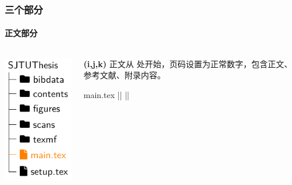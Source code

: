 \begin{frame}[fragile]
  \frametitle{三个部分}
  \framesubtitle{正文部分}
  \begin{columns}
    \begin{column}{0.4\textwidth}
      \includegraphics[page=9]{support/figures/thesisdir.pdf}
    \end{column}
    \begin{column}{0.6\textwidth}
      \alert{\textbf{(i,j,k)}} 正文从  处开始，页码设置为正常数字，包含正文、参考文献、附录内容。
      \begin{codeblock}[firstnumber=47]{main.tex}
|\highlightline|%
|\highlightline|\mainmatter







\printbibliography[heading=bibintoc]

\appendix
      \end{codeblock}
    \end{column}
  \end{columns}
\end{frame}


